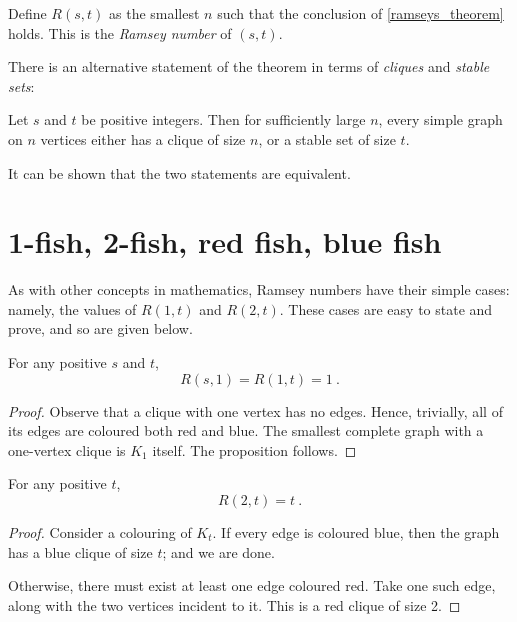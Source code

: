 \documentclass{article}
\begin{document}
\begin{Definition}
    Define $R(s,t)$ as the smallest $n$ such that the conclusion of \cref{ramseys_theorem} holds. This is the \textit{Ramsey number} of $(s,t)$.
\end{Definition}

There is an alternative statement of the theorem in terms of \textit{cliques} and \textit{stable sets}:

\begin{Theorem}
    Let $s$ and $t$ be positive integers. Then for sufficiently large $n$, every simple graph on $n$ vertices either has a clique of size $n$, or a stable set of size $t$.
\end{Theorem}

It can be shown that the two statements are equivalent.

\section{1-fish, 2-fish, red fish, blue fish}

As with other concepts in mathematics, Ramsey numbers have their simple cases: namely, the values of $R(1,t)$ and $R(2,t)$. These cases are easy to state and prove, and so are given below.

\begin{Proposition}
    For any positive $s$ and $t$,
    \[ R(s,1) = R(1,t) = 1 \ . \]
\end{Proposition}

\begin{proof}
    Observe that a clique with one vertex has no edges. Hence, trivially, all of its edges are coloured both red and blue. The smallest complete graph with a one-vertex clique is $K_1$ itself. The proposition follows.
\end{proof}

\begin{Proposition}
    For any positive $t$,
    \[ R(2,t) = t \ . \]
\end{Proposition}

\begin{proof}
    Consider a colouring of $K_t$. If every edge is coloured blue, then the graph has a blue clique of size $t$; and we are done.

    Otherwise, there must exist at least one edge coloured red. Take one such edge, along with the two vertices incident to it. This is a red clique of size 2.
\end{proof}
\end{document}
